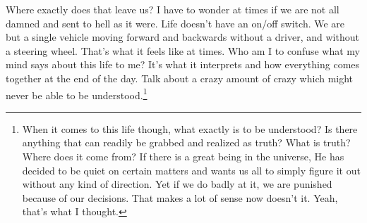 Where exactly does that leave us? I have to wonder at times if we are not all
damned and sent to hell as it were. Life doesn't have an on/off switch. We are
but a single vehicle moving forward and backwards without a driver, and without
a steering wheel. That's what it feels like at times. Who am I to confuse what
my mind says about this life to me? It's what it interprets and how everything
comes together at the end of the day. Talk about a crazy amount of crazy which
might never be able to be understood.\footnote{
When it comes to this life though, what exactly is to be understood? Is there
anything that can readily be grabbed and realized as truth? What is truth? Where
does it come from? If there is a great being in the universe, He has decided to
be quiet on certain matters and wants us all to simply figure it out without any
kind of direction. Yet if we do badly at it, we are punished because of our
decisions. That makes a lot of sense now doesn't it. Yeah, that's what I
thought.
}